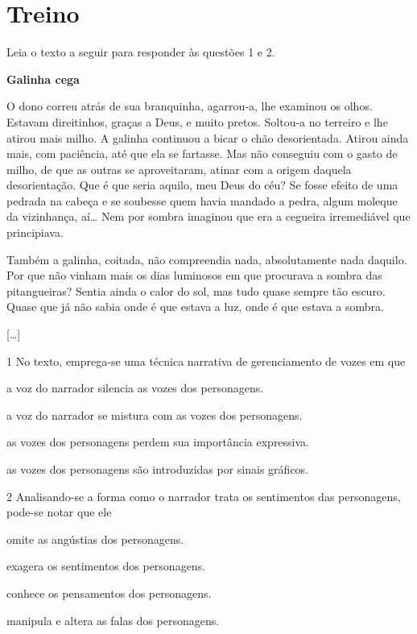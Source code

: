 
\section*{Treino}

Leia o texto a seguir para responder às questões 1 e 2.

\begin{myquote}
\textbf{Galinha cega}

O dono correu atrás de sua branquinha, agarrou-a, lhe examinou os olhos.
Estavam direitinhos, graças a Deus, e muito pretos. Soltou-a no terreiro
e lhe atirou mais milho. A galinha continuou a bicar o chão
desorientada. Atirou ainda mais, com paciência, até que ela se fartasse.
Mas não conseguiu com o gasto de milho, de que as outras se
aproveitaram, atinar com a origem daquela desorientação. Que é que seria
aquilo, meu Deus do céu? Se fosse efeito de uma pedrada na cabeça e se
soubesse quem havia mandado a pedra, algum moleque da vizinhança,
aí\ldots{} Nem por sombra imaginou que era a cegueira irremediável que
principiava.

Também a galinha, coitada, não compreendia nada, absolutamente nada
daquilo. Por que não vinham mais os dias luminosos em que procurava a
sombra das pitangueiras? Sentia ainda o calor do sol, mas tudo quase
sempre tão escuro. Quase que já não sabia onde é que estava a luz, onde
é que estava a sombra.

{[}\ldots{]}

\end{myquote}

\num{1} No texto, emprega-se uma técnica narrativa de gerenciamento de
vozes em que

\begin{escolha}
\item a voz do narrador silencia as vozes dos personagens.
\item a voz do narrador se mistura com as vozes dos personagens.
\item as vozes dos personagens perdem sua importância expressiva.
\item as vozes dos personagens são introduzidas por sinais gráficos.
\end{escolha}

\num{2} Analisando-se a forma como o narrador trata os sentimentos das personagens, pode-se notar que ele

\begin{escolha}
\item omite as angústias dos personagens.
\item exagera os sentimentos dos personagens.
\item conhece os pensamentos dos personagens.
\item manipula e altera as falas dos personagens.
\end{escolha}

